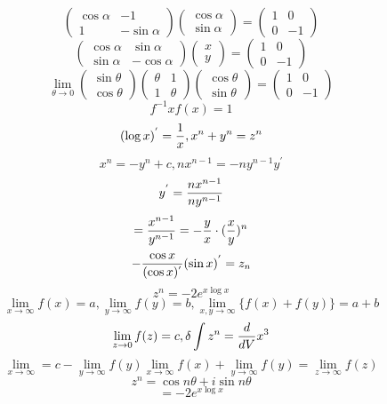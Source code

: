 \documentclass{jsarticle}
\begin{document}
   $$ \begin{pmatrix} \cos \alpha & - 1 \\
	   1 & - \sin \alpha \end{pmatrix} \begin{pmatrix} \cos \alpha \\ 
		   \sin \alpha
   \end{pmatrix} = \begin{pmatrix} 1 & 0 \\
   0 & - 1 \end{pmatrix} $$
   $$ \begin{pmatrix} \cos \alpha & \sin \alpha \\
   \sin \alpha & - \cos \alpha \end{pmatrix} \begin{pmatrix}
   x \\ y \end{pmatrix} = \begin{pmatrix} 1 & 0 \\
   0 & - 1 \end{pmatrix} $$
   $$ \lim_{\theta \to 0} \begin{pmatrix} \sin \theta \\ \cos \theta 
   \end{pmatrix} \begin{pmatrix} \theta & 1 \\
   1 & \theta \end{pmatrix} \begin{pmatrix} \cos \theta \\ \sin \theta
	   \end{pmatrix} = \begin{pmatrix} 1 & 0 \\ 0 & - 1 \end{pmatrix} $$
		   $$ f^{-1}xf(x) = 1 $$
		   $$ (\log x)^{'} = {1 \over x}, x^n + y^n = z^n  $$
		   $$ x^n = - y^n + c, nx^{n-1} = -n y^{n-1}y^{'} $$
		   $$ y^{'} = {{n x^{n-1}} \over {n y^{n-1}}} $$
		   $$ = {x^{n-1} \over y^{n-1}}= - {y \over x}\cdot
		   ({x \over y})^n $$
		   $$ - {\cos x \over (\cos x)^{'}}(\sin x)^{'} = z_n $$
		   $$ z^n = - 2 e^{x \log x} $$
		   $$ \lim_{x \to \infty} f(x) = a, \lim_{y \to \infty}
		   f(y) = b, \lim_{x,y \to \infty}\{f(x) + f(y)\} = a + b  $$
		   $$ \lim_{z \to 0}f(z) = c, \delta \int z^n = {d \over dV}
		   x^3 $$
		   $$ \lim_{x \to \infty} = c - \lim_{y \to \infty}f(y)
		   \lim_{x \to \infty} f(x) + \lim_{y \to \infty}f(y) = 
		   \lim_{z \to \infty}f(z) $$
		   $$ z^n = \cos n \theta + i \sin n \theta $$
		   $$ = - 2 e^{x \log x} $$
\end{document}
